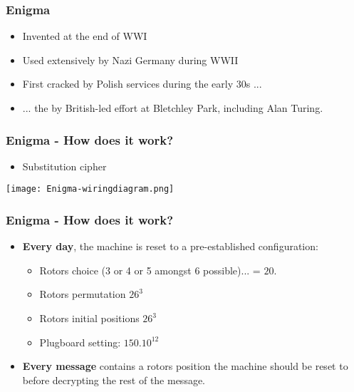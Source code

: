 \documentclass[
hyperref={pdfpagelabels=false}
,xcolor=table
]
{beamer}
\begin{document}
\begin{frame}
  \frametitle{Enigma}

  \begin{itemize}
  \item Invented at the end of WWI
  \item Used extensively by Nazi Germany during WWII
  \item First cracked by Polish services during the early 30s ... 
  \item ... the by British-led effort at Bletchley Park, including Alan Turing. 
  \end{itemize}
\end{frame}


\begin{frame}
  \frametitle{Enigma - How does it work?}

  \begin{itemize}
  \item Substitution cipher
  \end{itemize}

  \begin{center}
    \texttt{[image: Enigma-wiringdiagram.png]}
  \end{center}
 
\end{frame}


\begin{frame}
  \frametitle{Enigma - How does it work?}
  \begin{itemize}
  \item \textbf{Every day}, the machine is reset to a pre-established configuration:
    \begin{itemize}
    \item Rotors choice (3 or 4 or 5 amongst 6 possible)... = $20$. 
    \item Rotors permutation $26^3$ 
    \item Rotors initial positions $26^3$ 
    \item Plugboard setting: $150.10^{12}$
    \end{itemize}
  \item \textbf{Every message} contains a rotors position the machine
    should be reset to before decrypting the rest of the message.
  \end{itemize}  
\end{frame}
\end{document}
